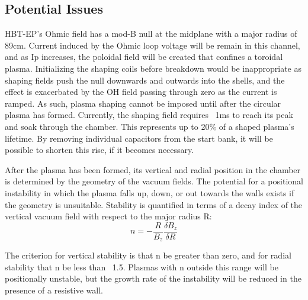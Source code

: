 \documentclass[aps,preprint,showpacs,superscriptaddress,groupedaddress]{revtex4}  %
\begin{document}
\subsection{Potential Issues}
	HBT-EP's Ohmic field has a mod-B null at the midplane with a major radius of 89cm.  Current induced by the Ohmic loop voltage will be remain in this channel, and as Ip increases, the poloidal field will be created that confines a toroidal plasma.  Initializing the shaping coils before breakdown would be inappropriate as shaping fields push the null downwards and outwards into the shells, and the effect is exacerbated by the OH field passing through zero as the current is ramped.  As such, plasma shaping cannot be imposed until after the circular plasma has formed.  Currently, the shaping field requires ~1ms to reach its peak and soak through the chamber.  This represents up to 20\% of a shaped plasma's lifetime.  By removing individual capacitors from the start bank, it will be possible to shorten this rise, if it becomes necessary.\par
	After the plasma has been formed, its vertical and radial position in the chamber is determined by the geometry of the vacuum fields.  The potential for a positional instability in which the plasma falls up, down, or out towards the walls exists if the geometry is unsuitable.  Stability is quantified in terms of a decay index of the vertical vacuum field with respect to the major radius R:$$n = -\frac{R}{B_z}\frac{\delta B_z}{\delta R}$$\par
	The criterion for vertical stability is that n be greater than zero, and for radial stability that n be less than ~1.5.  Plasmas with n outside this range will be positionally unstable, but the growth rate of the instability will be reduced in the presence of a resistive wall\cite{Fukuyama}.%
\end{document}
